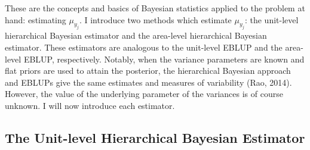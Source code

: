 \documentclass[12pt,twoside]{reedthesis}
\begin{document}
These are the concepts and basics of Bayesian statistics applied to the problem at hand: estimating \(\mu_{y_j}\). I introduce two methods which estimate \(\mu_{y_j}\): the unit-level hierarchical Bayesian estimator and the area-level hierarchical Bayesian estimator. These estimators are analogous to the unit-level EBLUP and the area-level EBLUP, respectively. Notably, when the variance parameters are known and flat priors are used to attain the posterior, the hierarchical Bayesian approach and EBLUPs give the same estimates and measures of variability (Rao, 2014). However, the value of the underlying parameter of the variances is of course unknown. I will now introduce each estimator.

\hypertarget{the-unit-level-hierarchical-bayesian-estimator}{%
\subsection{The Unit-level Hierarchical Bayesian Estimator}\label{the-unit-level-hierarchical-bayesian-estimator}}
\end{document}
